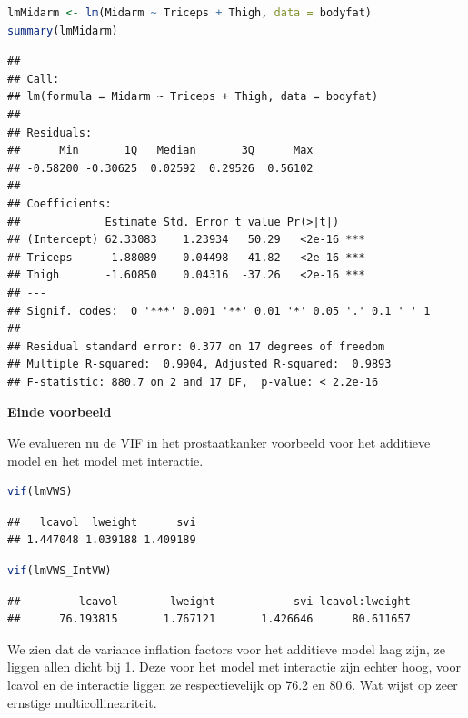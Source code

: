 \documentclass[
  12pt,dutch,coursenotes]{book}
\theoremstyle{definition}
\theoremstyle{definition}
\theoremstyle{definition}
\theoremstyle{definition}
\theoremstyle{remark}
\begin{document}
\begin{lstlisting}[language=R]
lmMidarm <- lm(Midarm ~ Triceps + Thigh, data = bodyfat)
summary(lmMidarm)
\end{lstlisting}

\begin{lstlisting}
## 
## Call:
## lm(formula = Midarm ~ Triceps + Thigh, data = bodyfat)
## 
## Residuals:
##      Min       1Q   Median       3Q      Max 
## -0.58200 -0.30625  0.02592  0.29526  0.56102 
## 
## Coefficients:
##             Estimate Std. Error t value Pr(>|t|)    
## (Intercept) 62.33083    1.23934   50.29   <2e-16 ***
## Triceps      1.88089    0.04498   41.82   <2e-16 ***
## Thigh       -1.60850    0.04316  -37.26   <2e-16 ***
## ---
## Signif. codes:  0 '***' 0.001 '**' 0.01 '*' 0.05 '.' 0.1 ' ' 1
## 
## Residual standard error: 0.377 on 17 degrees of freedom
## Multiple R-squared:  0.9904, Adjusted R-squared:  0.9893 
## F-statistic: 880.7 on 2 and 17 DF,  p-value: < 2.2e-16
\end{lstlisting}

\textbf{Einde voorbeeld}

We evalueren nu de VIF in het prostaatkanker voorbeeld voor het additieve model en het model met interactie.

\begin{lstlisting}[language=R]
vif(lmVWS)
\end{lstlisting}

\begin{lstlisting}
##   lcavol  lweight      svi 
## 1.447048 1.039188 1.409189
\end{lstlisting}

\begin{lstlisting}[language=R]
vif(lmVWS_IntVW)
\end{lstlisting}

\begin{lstlisting}
##         lcavol        lweight            svi lcavol:lweight 
##      76.193815       1.767121       1.426646      80.611657
\end{lstlisting}

We zien dat de variance inflation factors voor het additieve model laag zijn, ze liggen allen dicht bij 1.
Deze voor het model met interactie zijn echter hoog, voor lcavol en de interactie liggen ze respectievelijk op 76.2 en 80.6.
Wat wijst op zeer ernstige multicollineariteit.
\end{document}
